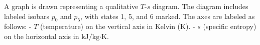 A graph is drawn representing a qualitative \( T \)-\( s \) diagram. The diagram includes labeled isobars \( p_0 \) and \( p_5 \), with states 1, 5, and 6 marked. The axes are labeled as follows:  
- \( T \) (temperature) on the vertical axis in Kelvin (K).  
- \( s \) (specific entropy) on the horizontal axis in \( \text{kJ}/\text{kg·K} \).